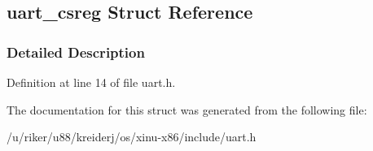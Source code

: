 \hypertarget{structuart__csreg}{}\subsection{uart\+\_\+csreg Struct Reference}
\label{structuart__csreg}


\subsubsection{Detailed Description}


Definition at line 14 of file uart.\+h.



The documentation for this struct was generated from the following file\+:\begin{DoxyCompactItemize}
\item 
/u/riker/u88/kreiderj/os/xinu-\/x86/include/uart.\+h\end{DoxyCompactItemize}
